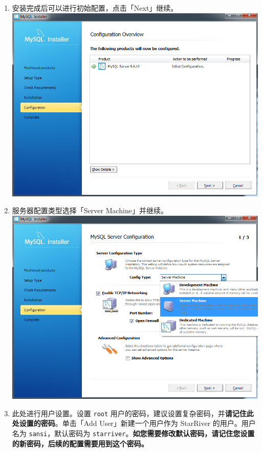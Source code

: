 \begin{enumerate}
\item
  安装完成后可以进行初始配置，点击「Next」继续。
  \includegraphics{img/mysql_6.png}
\item
  服务器配置类型选择「Server Machine」并继续。
  \includegraphics{img/mysql_7.png}
\item
  此处进行用户设置。设置 \texttt{root}
  用户的密码，建议设置复杂密码，并\textbf{请记住此处设置的密码}。单击「Add
  User」新建一个用户作为 StarRiver 的用户。用户名为
  \texttt{sansi}，默认密码为
  \texttt{starriver}。\textbf{如您需要修改默认密码，请记住您设置的新密码，后续的配置需要用到这个密码。}

\end{enumerate}
